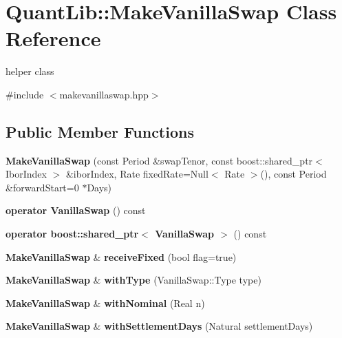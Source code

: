 \section{Quant\+Lib\+:\+:Make\+Vanilla\+Swap Class Reference}
\label{class_quant_lib_1_1_make_vanilla_swap}


helper class  




{\ttfamily \#include $<$makevanillaswap.\+hpp$>$}

\subsection*{Public Member Functions}
\begin{DoxyCompactItemize}
\item 
{\bfseries Make\+Vanilla\+Swap} (const Period \&swap\+Tenor, const boost\+::shared\+\_\+ptr$<$ Ibor\+Index $>$ \&ibor\+Index, Rate fixed\+Rate=Null$<$ Rate $>$(), const Period \&forward\+Start=0 $\ast$Days)\label{class_quant_lib_1_1_make_vanilla_swap_ab9846fb0d0833318e4c649497ec2a509}

\item 
{\bfseries operator Vanilla\+Swap} () const \label{class_quant_lib_1_1_make_vanilla_swap_a0fff0ddfe313df223c763e03f2c00cf0}

\item 
{\bfseries operator boost\+::shared\+\_\+ptr$<$ Vanilla\+Swap $>$} () const \label{class_quant_lib_1_1_make_vanilla_swap_aa2927a2bfcde3191681b0950fadd5f75}

\item 
{\bf Make\+Vanilla\+Swap} \& {\bfseries receive\+Fixed} (bool flag=true)\label{class_quant_lib_1_1_make_vanilla_swap_a2564464afc61bcd19b1f35dfe1c43935}

\item 
{\bf Make\+Vanilla\+Swap} \& {\bfseries with\+Type} (Vanilla\+Swap\+::\+Type type)\label{class_quant_lib_1_1_make_vanilla_swap_ad1908786d29db9a91f3bccdc0bf5e3fd}

\item 
{\bf Make\+Vanilla\+Swap} \& {\bfseries with\+Nominal} (Real n)\label{class_quant_lib_1_1_make_vanilla_swap_a30725ae606af949cea9600ba472d0927}

\item 
{\bf Make\+Vanilla\+Swap} \& {\bfseries with\+Settlement\+Days} (Natural settlement\+Days)\label{class_quant_lib_1_1_make_vanilla_swap_a55d63379f8fd92d57793608236f7aac0}


\end{DoxyCompactItemize}

